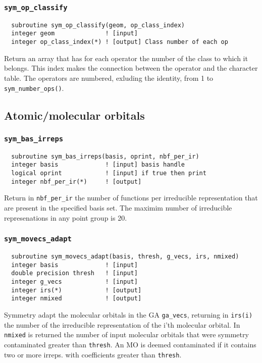 \subsubsection{{\tt sym\_op\_classify}}
\begin{verbatim}
  subroutine sym_op_classify(geom, op_class_index)
  integer geom              ! [input]
  integer op_class_index(*) ! [output] Class number of each op
\end{verbatim}
Return an array that has for each operator the number of the class to
which it belongs.  This index makes the connection between the
operator and the character table.  The operators are numbered,
exluding the identity, from 1 to \verb+sym_number_ops()+.

\subsection{Atomic/molecular orbitals}

\subsubsection{{\tt sym\_bas\_irreps}}
\begin{verbatim}
  subroutine sym_bas_irreps(basis, oprint, nbf_per_ir)
  integer basis             ! [input] basis handle
  logical oprint            ! [input] if true then print
  integer nbf_per_ir(*)     ! [output] 
\end{verbatim}
Return in \verb+nbf_per_ir+ the number of functions per irreducible
representation that are present in the specified basis set.  The
maximim number of irreducible represenations in any point group is 20.

\subsubsection{{\tt sym\_movecs\_adapt}}
\begin{verbatim}
  subroutine sym_movecs_adapt(basis, thresh, g_vecs, irs, nmixed)
  integer basis             ! [input]
  double precision thresh   ! [input]
  integer g_vecs            ! [input]
  integer irs(*)            ! [output]
  integer nmixed            ! [output]
\end{verbatim}
Symmetry adapt the molecular orbitals in the GA \verb+ga_vecs+,
returning in \verb+irs(i)+ the number of the irreducible
representation of the i'th molecular orbital.  In \verb+nmixed+ is
returned the number of input molecular orbitals that were symmetry
contaminated greater than \verb+thresh+.  An MO is deemed contaminated
if it contains two or more irreps. with coefficients greater than
\verb+thresh+.

